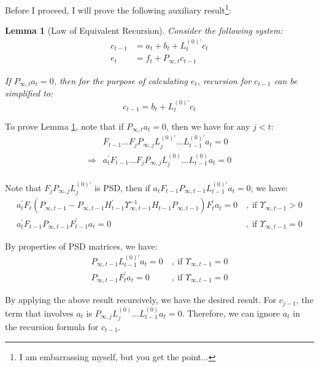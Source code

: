 \documentclass[10pt, titlepage]{article}
\newtheorem{lemma}{Lemma}
\numberwithin{equation}{section}
\begin{document}
Before I proceed, I will prove the following auxiliary result\footnote{I am embarrassing myself, but you get the point...}:
\begin{lemma}[Law of Equivalent Recursion] \label{lem:2}
    Consider the following system:
    \begin{align*}
        c_{t-1} &= a_t + b_t + L_{t}^{(0)'}c_t \\
        e_t &= f_t + P_{\infty,t}c_{t-1}
    \end{align*}

    If $P_{\infty,t}a_t=0$, then for the purpose of calculating $e_t$, recursion for $c_{t-1}$ can be simplified to:
    \[
        c_{t-1} = b_t + L_t^{(0)'}c_t
    \]
\end{lemma}

To prove Lemma \ref{lem:2}, note that if $P_{\infty,t}a_t=0$, then we have for any $j<t$:
\begin{align*}
    & F_{t-1}...F_jP_{\infty,j}L_{j}^{(0)'}...L_{t-1}^{(0)'}a_t=0 \\
    \Rightarrow & a_t^{'}F_{t-1}...F_jP_{\infty,j}L_{j}^{(0)}...L_{t-1}^{(0)}a_t=0 \\
\end{align*}

Note that $F_jP_{\infty,j}L_j^{(0)'}$ is PSD, then if $a_tF_{t-1}P_{\infty,t-1}L_{t-1}^{(0)'}a_t=0$, we have:
\begin{align*}
    a_t^{'}F_t(P_{\infty,t-1}-P_{\infty,t-1}H_{t-1}^{'}\Upsilon_{\infty,t-1}^{-1}H_{t-1}P_{\infty,t-1})F_t^{'}a_t=0\ &,\ \text{if } \Upsilon_{\infty,t-1}>0 \\
    a_t^{'}F_{t-1}P_{\infty,t-1}F_{t-1}^{'}a_t=0\ &,\ \text{if } \Upsilon_{\infty,t-1}=0 
\end{align*}

By properties of PSD matrices, we have:
\begin{align*}
    P_{\infty,t-1}L_{t-1}^{(0)'}a_t=0\ &,\ \text{if } \Upsilon_{\infty,t-1}=0 \\
    P_{\infty,t-1}F_t^{'}a_t=0\ &,\ \text{if } \Upsilon_{\infty,t-1}=0
\end{align*}

By applying the above result recursively, we have the desired result. For $c_{j-1}$, the term that involves $a_t$ is $P_{\infty,j}L_{j}^{(0)}...L_{t-1}^{(0)}a_t=0$. Therefore, we can ignore $a_t$ in the recursion formula for $c_{t-1}$. 
\end{document}
